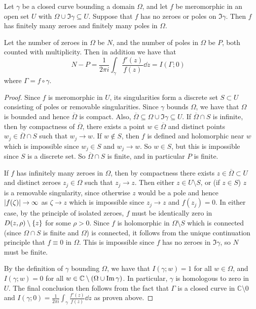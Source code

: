 \begin{corollary}
	Let \( \gamma \) be a closed curve bounding a domain \( \Omega \), and let \( f \) be meromorphic in an open set \( U \) with \( \Omega \cup \Im \gamma \subseteq U \).
	Suppose that \( f \) has no zeroes or poles on \( \Im \gamma \).
	Then \( f \) has finitely many zeroes and finitely many poles in \( \Omega \).

	Let the number of zeroes in \( \Omega \) be \( N \), and the number of poles in \( \Omega \) be \( P \), both counted with multiplicity.
	Then in addition we have that
	\[ N - P = \frac{1}{2 \pi i} \int_\gamma \frac{f'(z)}{f(z)} \dd{z} = I(\Gamma;0) \]
	where \( \Gamma = f \circ \gamma \).
\end{corollary}
\begin{proof}
	Since \( f \) is meromorphic in \( U \), its singularities form a discrete set \( S \subset U \) consisting of poles or removable singularities.
	Since \( \gamma \) bounds \( \Omega \), we have that \( \Omega \) is bounded and hence \( \overline \Omega \) is compact.
	Also, \( \overline \Omega \subseteq \Omega \cup \Im \gamma \subseteq U \).
	If \( \overline \Omega \cap S \) is infinite, then by compactness of \( \overline \Omega \), there exists a point \( w \in \overline \Omega \) and distinct points \( w_j \in \overline \Omega \cap S \) such that \( w_j \to w \).
	If \( w \not\in S \), then \( f \) is defined and holomorphic near \( w \) which is impossible since \( w_j \in S \) and \( w_j \to w \).
	So \( w \in S \), but this is impossible since \( S \) is a discrete set.
	So \( \overline \Omega \cap S \) is finite, and in particular \( P \) is finite.

	If \( f \) has infinitely many zeroes in \( \Omega \), then by compactness there exists \( z \in \overline \Omega \subset U \) and distinct zeroes \( z_j \in \Omega \) such that \( z_j \to z \).
	Then either \( z \in U \setminus S \), or (if \( z \in S \)) \( z \) is a removable singularity, since otherwise \( z \) would be a pole and hence \( \abs{f(\zeta)} \to \infty \) as \( \zeta \to z \) which is impossible since \( z_j \to z \) and \( f(z_j) = 0 \).
	In either case, by the principle of isolated zeroes, \( f \) must be identically zero in \( D(z,\rho) \setminus \qty{z} \) for some \( \rho > 0 \).
	Since \( f \) is holomorphic in \( \Omega \setminus S \) which is connected (since \( \Omega \cap S \) is finite and \( \Omega \)) is connected, it follows from the unique continuation principle that \( f \equiv 0 \) in \( \Omega \).
	This is impossible since \( f \) has no zeroes in \( \Im \gamma \), so \( N \) must be finite.

	By the definition of \( \gamma \) bounding \( \Omega \), we have that \( I(\gamma;w) = 1 \) for all \( w \in \Omega \), and \( I(\gamma;w) = 0 \) for all \( w \in \mathbb C \setminus \qty(\Omega \cup \Im \gamma) \).
	In particular, \( \gamma \) is homologous to zero in \( U \).
	The final conclusion then follows from the fact that \( \Gamma \) is a closed curve in \( \mathbb C \setminus \qty{0} \) and \( I(\gamma;0) = \frac{1}{2\pi i} \int_\gamma \frac{f'(z)}{f(z)} \dd{z} \) as proven above.
\end{proof}

